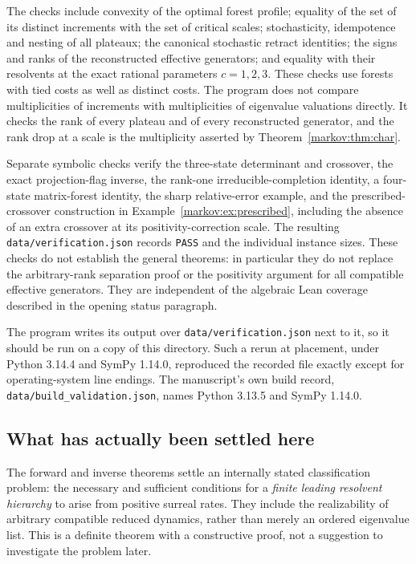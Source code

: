 \documentclass[11pt]{article}
\numberwithin{equation}{section}
\theoremstyle{definition}
\theoremstyle{remark}
\begin{document}
The checks include convexity of the optimal forest profile; equality of the set
of its distinct increments with the set of critical scales; stochasticity,
idempotence and
nesting of all plateaux; the canonical stochastic retract identities; the signs
and ranks of the reconstructed effective generators; and equality with their
resolvents at the exact rational parameters $c=1,2,3$. These checks use forests
with tied costs as well as distinct costs. The program does not compare
multiplicities of increments with multiplicities of eigenvalue valuations
directly. It checks the rank of every plateau and of every reconstructed
generator, and the rank drop at a scale is the multiplicity asserted by
Theorem~\ref{markov:thm:char}.

Separate symbolic checks verify the three-state determinant and crossover,
the exact projection-flag inverse, the rank-one irreducible-completion identity,
a four-state matrix-forest identity, the sharp relative-error example, and the
prescribed-crossover construction in Example~\ref{markov:ex:prescribed}, including the
absence of an extra crossover at its positivity-correction scale. The resulting
\texttt{data/verification.json} records \texttt{PASS} and the individual instance
sizes. These checks do not establish the general theorems: in particular they do
not replace the arbitrary-rank separation proof or the positivity argument for
all compatible effective generators. They are independent of the algebraic
Lean coverage described in the opening status paragraph.

The program writes its output over \texttt{data/verification.json} next to it,
so it should be run on a copy of this directory. Such a rerun at placement,
under Python 3.14.4 and SymPy 1.14.0, reproduced the recorded file exactly
except for operating-system line endings. The manuscript's own build record,
\texttt{data/build\_validation.json}, names Python 3.13.5 and SymPy 1.14.0.

\subsection{What has actually been settled here}

The forward and inverse theorems settle an internally stated classification
problem: the necessary and sufficient conditions for a \emph{finite leading
resolvent hierarchy} to arise from positive surreal rates. They include the
realizability of arbitrary compatible reduced dynamics, rather than merely an
ordered eigenvalue list. This is a definite theorem with a constructive proof,
not a suggestion to investigate the problem later.
\end{document}
